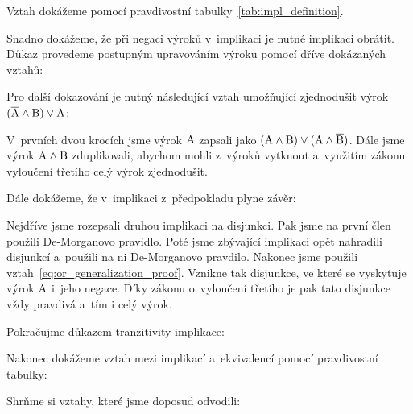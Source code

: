 
Vztah dokážeme pomocí pravdivostní tabulky~\ref{tab:impl_definition}.


Snadno dokážeme, že při negaci výroků v~implikaci je nutné implikaci obrátit. Důkaz provedeme postupným upravováním výroku pomocí dříve dokázaných vztahů:


Pro další dokazování je nutný následující vztah umožňující zjednodušit výrok \((\overline{\mathrm{A}} \land \mathrm{B}) \lor \mathrm{A}\):


V~prvních dvou krocích jsme výrok \(\mathrm{A}\) zapsali jako \((\mathrm{A} \land \mathrm{B}) \lor (\mathrm{A} \land \overline{\mathrm{B}})\). Dále jsme výrok \(\mathrm{A} \land \mathrm{B}\) zduplikovali, abychom mohli z~výroků vytknout a~využitím zákonu vyloučení třetího celý výrok zjednodušit.

Dále dokážeme, že v~implikaci z~předpokladu plyne závěr:


Nejdříve jsme rozepsali druhou implikaci na disjunkci. Pak jsme na první člen použili De-Morganovo pravidlo. Poté jsme zbývající implikaci opět nahradili disjunkcí a~použili na ni De-Morganovo pravdilo. Nakonec jsme použili vztah~\eqref{eq:or_generalization_proof}. Vznikne tak disjunkce, ve které se vyskytuje výrok 
\(\mathrm{A}\) i~jeho negace. Díky zákonu o~vyloučení třetího je pak tato disjunkce vždy pravdivá a~tím i celý výrok.

Pokračujme důkazem tranzitivity implikace:


Nakonec dokážeme vztah mezi implikací a~ekvivalencí pomocí pravdivostní tabulky:



Shrňme si vztahy, které jsme doposud odvodili:

\begin{fact}
\end{fact}

